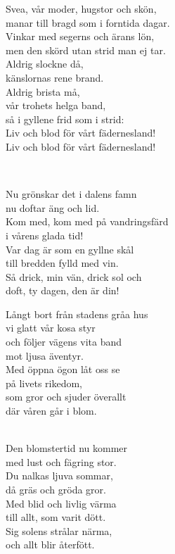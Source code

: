 Svea, vår moder, hugstor och skön,\\
manar till bragd som i forntida dagar.\\
Vinkar med segerns och ärans lön,\\
men den skörd utan strid man ej tar.\\
Aldrig slockne då,\\
känslornas rene brand.\\
Aldrig brista må,\\
vår trohets helga band,\\
så i gyllene frid som i strid:\\
Liv och blod för vårt fädernesland!\\
Liv och blod för vårt fädernesland!



 \\
\author{Text: Evelyn Lindström}

\songtext{} 
Nu grönskar det i dalens famn\\
nu doftar äng och lid.\\
Kom med, kom med på vandringsfärd\\
i vårens glada tid!\\
Var dag är som en gyllne skål\\
till bredden fylld med vin.\\
Så drick, min vän, drick sol och\\
doft, ty dagen, den är din!

Långt bort från stadens gråa hus\\
vi glatt vår kosa styr\\
och följer vägens vita band\\
mot ljusa äventyr.\\
Med öppna ögon låt oss se\\
på livets rikedom,\\
som gror och sjuder överallt\\
där våren går i blom. \\

\newpage
\\
\author{Text: Israel Kolmodin}

\songtext{} Den blomstertid nu kommer\\
med lust och fägring stor.\\
Du nalkas ljuva sommar,\\
då gräs och gröda gror.\\
Med blid och livlig värma\\
till allt, som varit dött.\\
Sig solens strålar närma,\\
och allt blir återfött.

